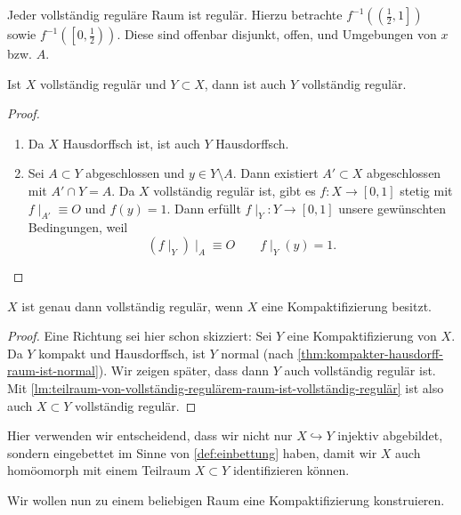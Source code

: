 \begin{remark}
    Jeder vollständig reguläre Raum ist regulär. Hierzu betrachte $f^{-1}\left( \left( \frac{1}{2},1 \right]  \right) $ sowie $f^{-1}\left( \left[ 0,\frac{1}{2}  \right)  \right) $. Diese sind offenbar disjunkt, offen, und Umgebungen von $x$ bzw.  $A$.
\end{remark}
\begin{lemma}\label{lm:teilraum-von-vollständig-regulärem-raum-ist-vollständig-regulär}
    Ist $X$ vollständig regulär und  $Y\subset X$, dann ist auch $Y$ vollständig regulär.
\end{lemma}
\begin{proof}
    \begin{enumerate}[1)]
        \item Da $X$ Hausdorffsch ist, ist auch  $Y$ Hausdorffsch.
        \item Sei  $A\subset Y$ abgeschlossen und $y\in Y \setminus A$. Dann existiert $A'\subset X$ abgeschlossen mit $A' \cap Y = A$. Da $X$ vollständig regulär ist,  gibt es  $f: X \to  [0,1]$ stetig mit $f\mid _{A'} \equiv  O$ und $f(y) = 1$. Dann erfüllt  $f\mid _Y : Y \to  [0,1]$ unsere gewünschten Bedingungen, weil
            \[
                \left(            f\mid _Y \right) \mid _A \equiv O \qquad f\mid _Y(y) = 1
            .\] 
    \end{enumerate}
\end{proof}
\begin{theorem}\label{thm:vollständig-regulär-wenn-kompaktifizierbar}
    $X$ ist genau dann vollständig regulär, wenn  $X$ eine Kompaktifizierung besitzt.
\end{theorem}
\begin{proof}
    Eine Richtung sei hier schon skizziert: Sei $Y$ eine Kompaktifizierung von  $X$. Da $Y$ kompakt und Hausdorffsch, ist  $Y$ normal (nach \autoref{thm:kompakter-hausdorff-raum-ist-normal}). Wir zeigen später, dass dann  $Y$ auch vollständig regulär ist. Mit \autoref{lm:teilraum-von-vollständig-regulärem-raum-ist-vollständig-regulär} ist also auch $X\subset Y$ vollständig regulär.
\end{proof}
\begin{remark*}
    Hier verwenden wir entscheidend, dass wir nicht nur $X\hookrightarrow Y$ injektiv abgebildet, sondern eingebettet im Sinne von \autoref{def:einbettung} haben, damit wir $X$ auch homöomorph mit einem Teilraum $X\subset Y$ identifizieren können.
\end{remark*}
Wir wollen nun zu einem beliebigen Raum eine Kompaktifizierung konstruieren.
